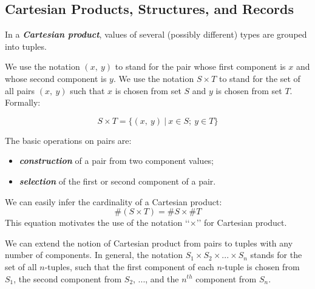 \documentclass{article}
\begin{document}
\subsection{Cartesian Products, Structures, and Records}

In a \textbf{\textit{Cartesian product}}, values of several (possibly different) types are grouped into tuples.

We use the notation $(x,\ y)$ to stand for the pair whose first component is $x$ and whose second component is $y$. We use the notation $S \times T$ to stand for the set of all pairs $(x,\ y)$ such that $x$ is chosen from set $S$ and $y$ is chosen from set $T$. Formally:

\begin{equation}
    S \times T = \{(x,\ y)\ |\ x \in S;\ y \in T\}
\end{equation}

\newpage

The basic operations on pairs are:
\begin{itemize}
    \item \textbf{\textit{construction}} of a pair from two component values;
    \item \textbf{\textit{selection}} of the first or second component of a pair.
\end{itemize}

We can easily infer the cardinality of a Cartesian product:
\begin{equation}
    \text{\#}(S \times T) = \text{\#}S \times \text{\#}T
\end{equation}
This equation motivates the use of the notation ‘‘$\times$’’ for Cartesian product.

We can extend the notion of Cartesian product from pairs to tuples with any number of components. In general, the notation $S_1 \times S_2 \times ... \times S_n$ stands for the set of all $n$-tuples, such that the first component of each $n$-tuple is chosen from $S_1$, the second component from $S_2$, ..., and the $n^{th}$ component from $S_n$.
\end{document}
